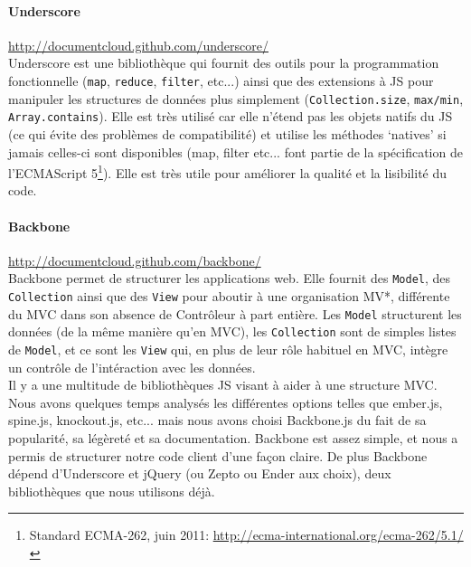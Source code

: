 \documentclass[pdftex,12pt,a4paper]{article}
\begin{document}
\paragraph{Underscore}\url{http://documentcloud.github.com/underscore/}\\
Underscore est une bibliothèque qui fournit des outils pour la programmation fonctionnelle (\texttt{map}, \texttt{reduce}, \texttt{filter}, etc...) ainsi que des extensions à JS pour manipuler les structures de données plus simplement (\texttt{Collection.size}, \texttt{max/min}, \texttt{Array.contains}). Elle est très utilisé car elle n’étend pas les objets natifs du JS (ce qui évite des problèmes de compatibilité) et utilise les méthodes ‘natives’ si jamais celles-ci sont disponibles (map, filter etc... font partie de la spécification de l’ECMAScript 5\footnote{Standard ECMA-262, juin 2011: \url{http://ecma-international.org/ecma-262/5.1/}}). Elle est très utile pour améliorer la qualité et la lisibilité du code.

\paragraph{Backbone}\url{http://documentcloud.github.com/backbone/}\\
Backbone permet de structurer les applications web. Elle fournit des \texttt{Model}, des \texttt{Collection} ainsi que des \texttt{View} pour aboutir à une organisation MV*, différente du MVC dans son absence de Contrôleur à part entière. Les \texttt{Model} structurent les données (de la même manière qu’en MVC), les \texttt{Collection} sont de simples listes de \texttt{Model}, et ce sont les \texttt{View} qui, en plus de leur rôle habituel en MVC, intègre un contrôle de l’intéraction avec les données.\\
Il y a une multitude de bibliothèques JS visant à aider à une structure MVC. Nous avons quelques temps analysés les différentes options telles que ember.js, spine.js, knockout.js, etc... mais nous avons choisi Backbone.js du fait de sa popularité, sa légèreté et sa documentation. Backbone est assez simple, et nous a permis de structurer notre code client d’une façon claire. De plus Backbone dépend d’Underscore et jQuery (ou Zepto ou Ender aux choix), deux bibliothèques que nous utilisons déjà.
\end{document}
